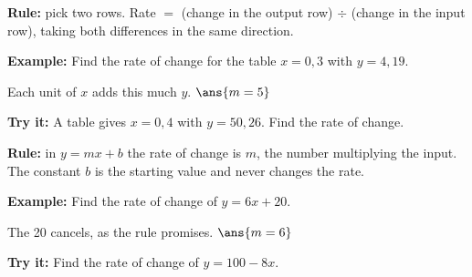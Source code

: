 \documentclass[12pt]{article}
\begin{document}


\begin{formulabox}
\textbf{Rule:} pick two rows. Rate $=$ (change in the output row) $\div$
(change in the input row), taking both differences in the same direction.
\end{formulabox}

\begin{examplebox}
\textbf{Example:} \quad Find the rate of change for the table
$x = 0, 3$ with $y = 4, 19$.

Each unit of $x$ adds this much $y$. \quad $\ans{m = 5}$
\end{examplebox}

\begin{tryitbox}
\textbf{Try it:} \quad A table gives $x = 0, 4$ with $y = 50, 26$. Find the
rate of change.\\[2pt]
\end{tryitbox}


\begin{formulabox}
\textbf{Rule:} in $y = mx + b$ the rate of change is $m$, the number
multiplying the input. The constant $b$ is the starting value and never
changes the rate.
\end{formulabox}

\begin{examplebox}
\textbf{Example:} \quad Find the rate of change of $y = 6x + 20$.

The 20 cancels, as the rule promises. \quad $\ans{m = 6}$
\end{examplebox}

\begin{tryitbox}
\textbf{Try it:} \quad Find the rate of change of $y = 100 - 8x$.\\[2pt]
\end{tryitbox}
\end{document}
